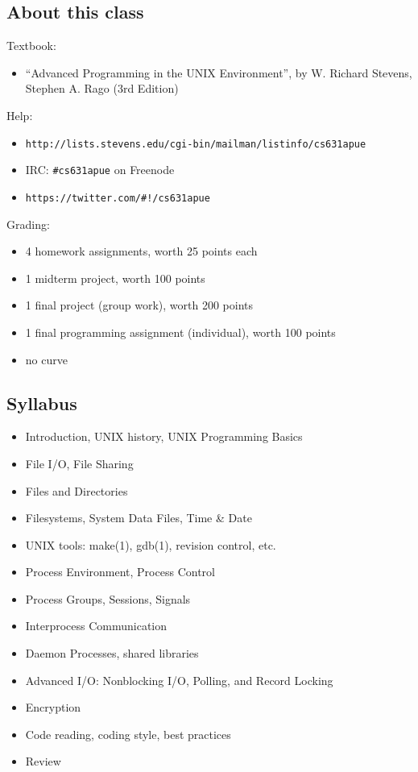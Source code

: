 \documentclass[sxga]{xdvislides}
\begin{document}
\subsection{About this class}
Textbook:
\begin{itemize}
	\item ``Advanced Programming in the UNIX Environment'', by
		W. Richard Stevens, Stephen A. Rago (3rd Edition)
\end{itemize}
\addvspace{.25in}
Help:
\begin{itemize}
	\item \verb+http://lists.stevens.edu/cgi-bin/mailman/listinfo/cs631apue+
	\item IRC: \verb+#cs631apue+ on Freenode
	\item \verb+https://twitter.com/#!/cs631apue+
\end{itemize}
\addvspace{.25in}

Grading:
\begin{itemize}
	\item 4 homework assignments, worth 25 points each
	\item 1 midterm project, worth 100 points
	\item 1 final project (group work), worth 200 points
	\item 1 final programming assignment (individual), worth 100 points
	\item no curve
\end{itemize}

\subsection{Syllabus}
\begin{itemize}
	\item Introduction, UNIX history, UNIX Programming Basics
	\item File I/O, File Sharing
	\item Files and Directories
	\item Filesystems, System Data Files, Time \& Date
	\item UNIX tools: make(1), gdb(1), revision control, etc.
	\item Process Environment, Process Control
	\item Process Groups, Sessions, Signals
	\item Interprocess Communication
	\item Daemon Processes, shared libraries
	\item Advanced I/O: Nonblocking I/O, Polling, and Record Locking
	\item Encryption
	\item Code reading, coding style, best practices
	\item Review
\end{itemize}
\end{document}
